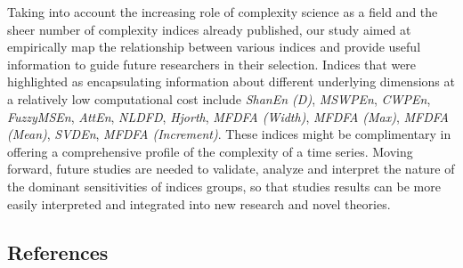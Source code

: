 \documentclass[
  man]{apa6}
\begin{document}
Taking into account the increasing role of complexity science as a field and the sheer number of complexity indices already published, our study aimed at empirically map the relationship between various indices and provide useful information to guide future researchers in their selection. Indices that were highlighted as encapsulating information about different underlying dimensions at a relatively low computational cost include \emph{ShanEn (D)}, \emph{MSWPEn}, \emph{CWPEn}, \emph{FuzzyMSEn}, \emph{AttEn}, \emph{NLDFD}, \emph{Hjorth}, \emph{MFDFA (Width)}, \emph{MFDFA (Max)}, \emph{MFDFA (Mean)}, \emph{SVDEn}, \emph{MFDFA (Increment)}. These indices might be complimentary in offering a comprehensive profile of the complexity of a time series. Moving forward, future studies are needed to validate, analyze and interpret the nature of the dominant sensitivities of indices groups, so that studies results can be more easily interpreted and integrated into new research and novel theories.

\newpage

\hypertarget{references}{%
\subsection{References}\label{references}}
\end{document}
